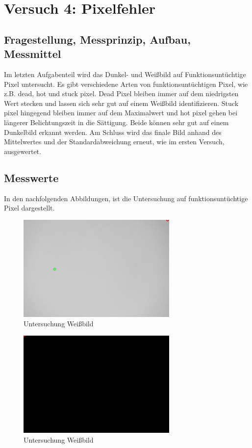\documentclass[12pt, oneside, a4paper, \docLanguage]{report}
\begin{document}
%
%
\chapter{Versuch 4: Pixelfehler}
\label{chap:VERSUCH_4}

\section{Fragestellung, Messprinzip, Aufbau, Messmittel}
\label{chap:VERSUCH_4_FRAGESTELLUNG}
Im letzten Aufgabenteil wird das Dunkel- und Weißbild auf Funktionsuntüchtige Pixel untersucht. Es gibt verschiedene Arten von funktionsuntüchtigen Pixel, wie z.B. dead, hot und stuck pixel. Dead Pixel bleiben immer auf dem niedrigsten Wert stecken und lassen sich sehr gut auf einem Weißbild identifizieren. Stuck pixel hingegend bleiben immer auf dem Maximalwert und hot pixel gehen bei längerer Belichtungszeit in die Sättigung. Beide können sehr gut auf einem Dunkelbild erkannt werden. Am Schluss wird das finale Bild anhand des Mittelwertes und der Standardabweichung erneut, wie im ersten Versuch, ausgewertet.
\newpage
\section{Messwerte}
\label{chap:VERSUCH_4_MESSWERTE}
In den nachfolgenden Abbildungen, ist die Untersuchung auf funktionsuntüchtige Pixel dargestellt.	 
\begin{figure}[H]
	\centering\small
	\includegraphics[width=0.7\textwidth]{media/circleWhiteImage.png}
	\caption{Untersuchung Weißbild}
	\label{fig:VERSUCH_4_MESSWERTE_WEISSBILD}
\end{figure}

\begin{figure}[H]
	\centering\small
	\includegraphics[width=0.7\textwidth]{media/circleBlackImage.png}
	\caption{Untersuchung Weißbild}
	\label{fig:VERSUCH_4_MESSWERTE_DUNKELBILD}
\end{figure}
\end{document}
